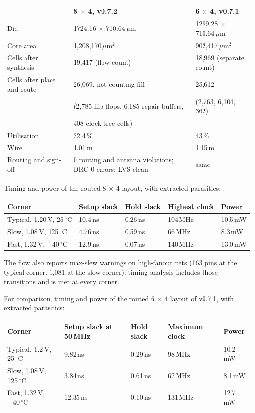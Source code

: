 \documentclass[11pt,a4paper]{article}
\begin{document}
\begin{center}
\begin{tabular}{@{}lll@{}}
\toprule
 & 8 $\times$ 4, v0.7.2 & 6 $\times$ 4, v0.7.1 \\
\midrule
Die & 1724.16 $\times$ 710.64\,$\mu$m & 1289.28 $\times$ 710.64\,$\mu$m \\
Core area & 1,208,170\,$\mu$m$^2$ & 902,417\,$\mu$m$^2$ \\
Cells after synthesis & 19,417 (flow count) & 18,969 (separate count) \\
Cells after place and route & 26,069, not counting fill & 25,612 \\
 & (2,785 flip-flops, 6,185 repair buffers, & (2,763, 6,104, 362) \\
 & 408 clock tree cells) & \\
Utilisation & 32.4\,\% & 43\,\% \\
Wire & 1.01\,m & 1.15\,m \\
Routing and sign-off & 0 routing and antenna violations; DRC 0 errors; LVS clean & same \\
\bottomrule
\end{tabular}
\end{center}

Timing and power of the routed 8 $\times$ 4 layout, with extracted parasitics:

\begin{center}
\begin{tabular}{@{}lllll@{}}
\toprule
Corner & Setup slack & Hold slack & Highest clock & Power \\
\midrule
Typical, 1.20\,V, 25\,$^\circ$C & 10.4\,ns & 0.26\,ns & 104\,MHz & 10.5\,mW \\
Slow, 1.08\,V, 125\,$^\circ$C & 4.76\,ns & 0.59\,ns & 66\,MHz & 8.3\,mW \\
Fast, 1.32\,V, $-$40\,$^\circ$C & 12.9\,ns & 0.07\,ns & 140\,MHz & 13.0\,mW \\
\bottomrule
\end{tabular}
\end{center}

The flow also reports max-slew warnings on high-fanout nets (163 pins at the typical corner, 1,081 at the slow corner); timing analysis includes those transitions and is met at every corner.

For comparison, timing and power of the routed 6 $\times$ 4 layout of v0.7.1, with extracted parasitics:


\begin{center}
\begin{tabular}{@{}lllll@{}}
\toprule
Corner & Setup slack at 50\,MHz & Hold slack & Maximum clock & Power \\
\midrule
Typical, 1.2\,V, 25\,$^\circ$C & 9.82\,ns & 0.29\,ns & 98\,MHz & 10.2\,mW \\
Slow, 1.08\,V, 125\,$^\circ$C & 3.84\,ns & 0.61\,ns & 62\,MHz & 8.1\,mW \\
Fast, 1.32\,V, $-40\,^\circ$C & 12.35\,ns & 0.10\,ns & 131\,MHz & 12.7\,mW \\
\bottomrule
\end{tabular}
\end{center}
\end{document}
